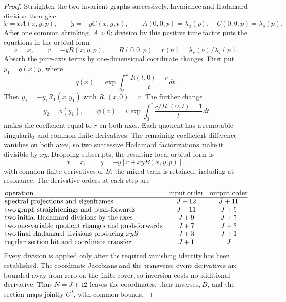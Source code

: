 \begin{proof}
Straighten the two invariant graphs successively.  Invariance and
Hadamard division then give
\[
 \dot x=xA(x,y,p),\qquad \dot y=-yC(x,y,p),
 \qquad A(0,0,p)=\lambda_u(p),\quad C(0,0,p)=\lambda_s(p).
\]
After one common shrinking, $A>0$; division by this positive time factor
puts the equations in the orbital form
\[
 \dot x=x,\qquad \dot y=-yR(x,y,p),\qquad
 R(0,0,p)=r(p)=\lambda_s(p)/\lambda_u(p).
\]
Absorb the pure-axis terms by one-dimensional coordinate changes.
First put $y_1=q(x)y$, where
\[
 q(x)=\exp\int_0^x\frac{R(t,0)-r}{t}\,dt.
\]
Then $\dot y_1=-y_1R_1(x,y_1)$ with $R_1(x,0)=r$.
The further change
\[
 y_2=\phi(y_1),\qquad
 \phi(v)=v\exp\int_0^v\frac{r/R_1(0,t)-1}{t}\,dt
\]
makes the coefficient equal to $r$ on both axes. Each quotient has
a removable singularity and common finite derivatives.  The remaining
coefficient difference vanishes on both axes, so two successive Hadamard
factorizations make it divisible by $xy$.  Dropping subscripts, the
resulting local orbital form is
\[
 \dot x=x,\qquad \dot y=-y[r+xyB(x,y,p)],
\]
with common finite derivatives of $B$; the mixed term is retained,
including at resonance. The derivative orders at each step are
\[
\begin{array}{@{}lcc@{}}
\text{operation} & \text{input order} & \text{output order}\\
\hline
\text{spectral projections and eigenframes} & J+12 & J+11\\
\text{two graph straightenings and push-forwards} & J+11 & J+9\\
\text{two initial Hadamard divisions by the axes} & J+9 & J+7\\
\text{two one-variable quotient changes and push-forwards} & J+7 & J+3\\
\text{two final Hadamard divisions producing }xyB & J+3 & J+1\\
\text{regular section hit and coordinate transfer} & J+1 & J
\end{array}
\]
Every division is applied only after the required vanishing identity has
been established. The coordinate Jacobians and the transverse event
derivatives are bounded away from zero on the finite cover, so inversion
costs no additional derivative. Thus $N=J+12$ leaves the coordinates,
their inverses, $B$, and the section maps jointly $C^J$, with common bounds.


\end{proof}
